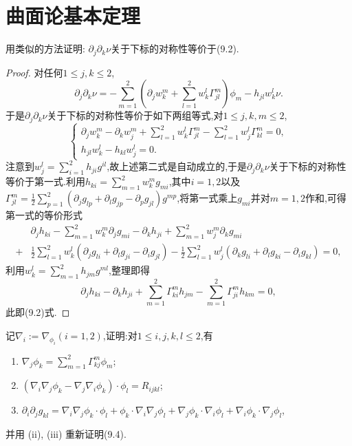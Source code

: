 \section{曲面论基本定理}
\begin{excise}
		用类似的方法证明: $\partial_{j}\partial_{k}\nu$关于下标的对称性等价于(9.2).
	\end{excise}
	\begin{proof}
		对任何$1\leqslant j,k\leqslant 2$,
		$$
		\partial_{j}\partial_{k}\nu=-\sum_{m=1}^{2}\left(\partial_{j}w_{k}^{m}+\sum_{l=1}^{2}w_{k}^{l}\Gamma_{jl}^{m}\right)\phi_{m}-h_{jl}w_{k}^{l}\nu.
		$$
		于是$\partial_{j}\partial_{k}\nu$关于下标的对称性等价于如下两组等式,对$1\leqslant j,k,m\leqslant 2$,
		$$
		\begin{cases}
			\displaystyle \partial_{j}w_{k}^{m}-\partial_{k}w_{j}^{m}+\sum_{l=1}^{2}w_{k}^{l}\Gamma_{jl}^{m}-\sum_{l=1}^{2}w_{j}^{l}\Gamma_{kl}^{m}=0,\\
			h_{jl}w_{k}^{l}-h_{kl}w_{j}^{l}=0.
		\end{cases}
		$$
		注意到$\displaystyle w_{j}^{l}=\sum_{i=1}^{2}h_{ji}g^{il}$,故上述第二式是自动成立的,于是$\partial_{j}\partial_{k}\nu$关于下标的对称性等价于第一式.利用$\displaystyle h_{ki}=\sum_{m=1}^{2}w_{k}^{m}g_{mi}$,其中$i=1,2$以及$\displaystyle \Gamma_{jl}^{m}=\frac{1}{2}\sum_{p=1}^{2}(\partial_{j}g_{lp}+\partial_{l}g_{jp}-\partial_{p}g_{jl})g^{mp}$,将第一式乘上$g_{mi}$并对$m=1,2$作和,可得第一式的等价形式
		\begin{align*}
		&\partial_{j}h_{ki}-\sum_{m=1}^{2}w_{k}^{m}\partial_{j}g_{mi}-\partial_{k}h_{ji}+\sum_{m=1}^{2}w_{j}^{m}\partial_{k}g_{mi}\\
		+&\frac{1}{2}\sum_{l=1}^{2}w_{k}^{l}(\partial_{j}g_{li}+\partial_{l}g_{ji}-\partial_{i}g_{jl})-\frac{1}{2}\sum_{l=1}^{2}w_{j}^{l}(\partial_{k}g_{li}+\partial_{l}g_{ki}-\partial_{i}g_{kl})=0,
		\end{align*}
		利用$\displaystyle w_{k}^{l}=\sum_{m=1}^{2}h_{jm}g^{ml}$,整理即得
		$$
		\partial_{j}h_{ki}-\partial_{k}h_{ji}+\sum_{m=1}^{2}\Gamma_{ki}^{m}h_{jm}-\sum_{m=1}^{2}\Gamma_{ji}^{m}h_{km}=0,
		$$
		此即(9.2)式.
	\end{proof}
	\begin{excise}
		记$\nabla_{i}:=\nabla_{\phi_{i}}(i=1,2)$,证明:对$1\leqslant i,j,k,l\leqslant 2$,有
		\begin{enumerate}[label=(\roman*)]
			\item $\displaystyle \nabla_{j}\phi_{k}=\sum_{m=1}^{2}\Gamma_{kj}^{m}\phi_{m}$;
			\item\label{9.2.2} $(\nabla_{i}\nabla_{j}\phi_{k}-\nabla_{j}\nabla_{i}\phi_{k})\cdot\phi_{l}=R_{ijkl}$;
			\item\label{9.2.3} $\partial_{i}\partial_{j}g_{kl}=\nabla_{i}\nabla_{j}\phi_{k}\cdot\phi_{l}+\phi_{k}\cdot\nabla_{i}\nabla_{j}\phi_{l}+\nabla_{j}\phi_{k}\cdot\nabla_{i}\phi_{l}+\nabla_{i}\phi_{k}\cdot\nabla_{j}\phi_{l}$,
		\end{enumerate}
        并用 (ii), (iii) 重新证明(9.4).
	\end{excise}
